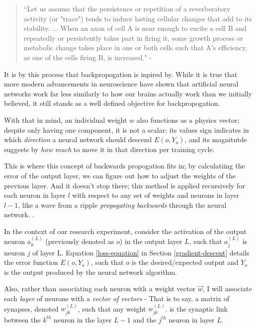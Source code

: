 \documentclass[12pt]{article}
\begin{document}
\begin{quote}
    ``Let us assume that the persistence or repetition of a reverberatory activity (or "trace") tends to induce lasting cellular changes that add to its stability. ... When an axon of cell A is near enough to excite a cell B and repeatedly or persistently takes part in firing it, some growth process or metabolic change takes place in one or both cells such that A's efficiency, as one of the cells firing B, is increased." - \textcite{Hebb1949}
\end{quote}

It is by this process that backpropogation is inpired by. While it is true that more modern advancements in neuroscience have shown that artificial neural networks work far less similarly to how our brains actually work than we initially believed, it still stands as a well defined objective for backpropogation.

With that in mind, an individual weight $w$ also functions as a physics vector; despite only having one component, it is not a scalar; its values sign indicates in which \textit{direction} a neural network should descend $E(o, Y_o)$, and its magnitutde suggests by \textit{how much} to move it in that direction per training cycle.

This is where this concept of backwards propogation fits in; by calculatiing the error of the output layer, we can figure out how to adjust the weights of the previous layer. And it doesn't stop there; this method is applied recursively for each neuron in layer $l$ with respect to any set of weights and neurons in layer $l - 1$, like a wave from a ripple \textit{propogating backwards} through the neural network. \textcite{Nielsen2015}.


In the context of our research experiment, consider the activation of the output neuron $a_k^{(L)}$ (previously denoted as $o$) in the output layer $L$, such that $a_j^{(L)}$ is neuron $j$ of layer L. Equation \ref{loss-equation} in Section \ref{gradient-descent} details the error function $E(o, Y_o)$, such that $o$ is the desired/expected output and $Y_o$ is the output produced by the neural network algorithm.

Also, rather than associating each neuron with a weight vector $\vec{w}$, I will associate each \textit{layer} of neurons with a \textit{vector of vectors} - That is to say, a matrix of synapses, denoted $w_{jk}^{(L)}$, such that any weight $w_{jk}^{(L)}$. is the synaptic link between the $k^{th}$ neuron in the layer $L-1$ and the $j^{th}$ neuron in layer $L$.
\end{document}
